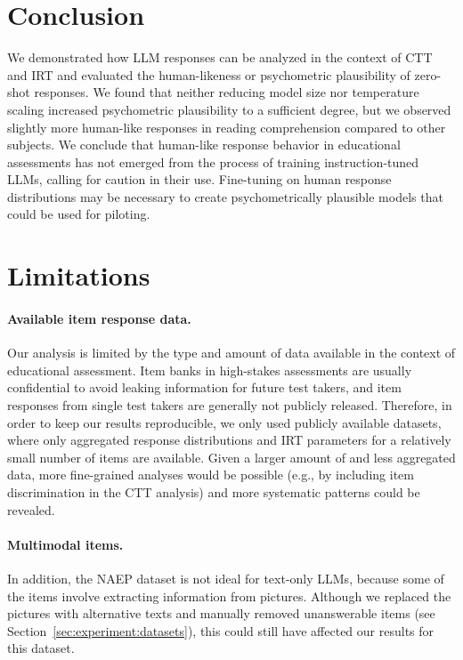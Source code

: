 \documentclass[11pt]{article}
\begin{document}
\section{Conclusion}

We demonstrated how LLM responses can be analyzed in the context of CTT and IRT and evaluated the human-likeness or psychometric plausibility of zero-shot responses. We found that neither reducing model size nor temperature scaling increased psychometric plausibility to a sufficient degree, but we observed slightly more human-like responses in reading comprehension compared to other subjects. We conclude that human-like response behavior in educational assessments has not emerged from the process of training instruction-tuned LLMs, calling for caution in their use. Fine-tuning on human response distributions may be necessary to create psychometrically plausible models that could be used for piloting.


\section*{Limitations}

\paragraph{Available item response data.}
Our analysis is limited by the type and amount of data available in the context of educational assessment. Item banks in high-stakes assessments are usually confidential to avoid leaking information for future test takers, and item responses from single test takers are generally not publicly released. Therefore, in order to keep our results reproducible, we only used publicly available datasets, where only aggregated response distributions and IRT parameters for a relatively small number of items are available. Given a larger amount of and less aggregated data, more fine-grained analyses would be possible (e.g., by including item discrimination in the CTT analysis) and more systematic patterns could be revealed.

\paragraph{Multimodal items.}
In addition, the NAEP dataset is not ideal for text-only LLMs, because some of the items involve extracting information from pictures. Although we replaced the pictures with alternative texts and manually removed unanswerable items (see Section~\ref{sec:experiment:datasets}), this could still have affected our results for this dataset.
\end{document}

